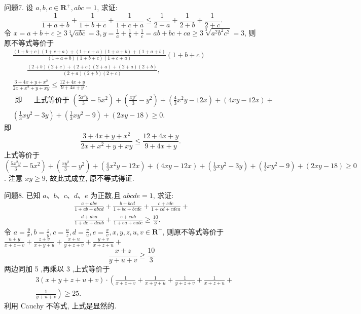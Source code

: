 问题7. 设 $a, b, c \in \mathbf{R}^{+}, a b c=1$, 求证:
$$
\frac{1}{1+a+b}+\frac{1}{1+b+c}+\frac{1}{1+c+a} \leqslant \frac{1}{2+a}+\frac{1}{2+b}+\frac{1}{2+c} .
$$
令 $x=a+b+c \geqslant 3 \sqrt[3]{a b c}=3, y=\frac{1}{a}+\frac{1}{b}+\frac{1}{c}=a b+b c+c a \geqslant 3 \sqrt[3]{a^2 b^2 c^2}=3$, 则原不等式等价于
$$
\begin{aligned}
& \frac{(1+b+c)(1+c+a)+(1+c+a)(1+a+b)+(1+a+b)}{(1+a+b)(1+b+c)(1+c+a)}(1+b+c) \\
& \qquad \frac{(2+b)(2+c)+(2+c)(2+a)+(2+a)(2+b)}{(2+a)(2+b)(2+c)}, \\
& \frac{3+4 x+y+x^2}{2 x+x^2+y+x y} \leqslant \frac{12+4 x+y}{9+4 x+y} . \\
& \text { 即 } \quad \text { 上式等价于 }\left(\frac{5 x^2 y}{3}-5 x^2\right)+\left(\frac{x y^2}{3}-y^2\right)+\left(\frac{4}{3} x^2 y-12 x\right)+(4 x y-12 x)+ \\
& \left(\frac{1}{3} x y^2-3 y\right)+\left(\frac{1}{3} x y^2-9\right)+(2 x y-18) \geqslant 0 .
\end{aligned}
$$
即
$$
\frac{3+4 x+y+x^2}{2 x+x^2+y+x y} \leqslant \frac{12+4 x+y}{9+4 x+y} \text {. }
$$
上式等价于 $\left(\frac{5 x^2 y}{3}-5 x^2\right)+\left(\frac{x y^2}{3}-y^2\right)+\left(\frac{4}{3} x^2 y-12 x\right)+(4 x y-12 x)+ \left(\frac{1}{3} x y^2-3 y\right)+\left(\frac{1}{3} x y^2-9\right)+(2 x y-18) \geqslant 0$.
注意 $x y \geqslant 9$, 故此式成立, 原不等式得证.



问题8. 已知 $a 、 b 、 c 、 d 、 e$ 为正数,且 $a b c d e=1$, 求证:
$$
\begin{gathered}
\frac{a+a b c}{1+a b+a b c d}+\frac{b+b c d}{1+b c+b c d e}+\frac{c+c d e}{1+c d+c d e a}+ \\
\frac{d+d e a}{1+d e+d e a b}+\frac{e+e a b}{1+e a+e a b c} \geqslant \frac{10}{3} .
\end{gathered}
$$
令 $a=\frac{y}{x}, b=\frac{z}{y}, c=\frac{u}{z}, d=\frac{v}{u}, e=\frac{x}{v}, x, y, z, u, v \in \mathbf{R}^{+}$, 则原不等式等价于 $\frac{u+y}{x+z+v}+\frac{z+v}{x+y+u}+\frac{x+u}{y+z+v}+\frac{y+v}{x+z+u}+$
$$
\frac{x+z}{y+u+v} \geqslant \frac{10}{3}
$$
两边同加 5 ,再乘以 3 ,上式等价于
$$
\begin{aligned}
& 3(x+y+z+u+v) \cdot\left(\frac{1}{x+z+v}+\frac{1}{x+y+u}+\frac{1}{y+z+v}+\frac{1}{x+z+u}+\right. \\
& \left.\frac{1}{y+u+v}\right) \geqslant 25 .
\end{aligned}
$$
利用 Cauchy 不等式, 上式是显然的.



